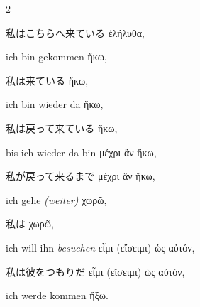 \begin{paracol}{2}
\begin{enumerate}[leftmargin=0pt,rightmargin=0pt,listparindent =1cm,labelindent=1cm,labelsep=1ex,labelwidth={*},itemindent={*},align=left]
\begin{continuousitemline}
\begin{japanese}
私はこちらへ来ている \textgreek[variant=ancient]{ἐλήλυθα,}
\end{japanese}
\switchcolumn*

\begin{german}
ich bin gekommen \textgreek[variant=ancient]{ἥκω,}
\end{german}
\switchcolumn

\begin{japanese}
私は来ている \textgreek[variant=ancient]{ἥκω,}
\end{japanese}
\switchcolumn*

\begin{german}
ich bin wieder da \textgreek[variant=ancient]{ἥκω,}
\end{german}
\switchcolumn

\begin{japanese}
私は戻って来ている \textgreek[variant=ancient]{ἥκω,}
\end{japanese}
\switchcolumn*

\begin{german}
bis ich wieder da bin \textgreek[variant=ancient]{μέχρι ἃν ἥκω,}
\end{german}
\switchcolumn

\begin{japanese}
私が戻って来るまで \textgreek[variant=ancient]{μέχρι ἃν ἥκω,}
\end{japanese}
\switchcolumn*

\begin{german}
ich gehe \emph{(weiter)} \textgreek[variant=ancient]{χωρῶ,}
\end{german}
\switchcolumn

\begin{japanese}
私は \textgreek[variant=ancient]{χωρῶ,}
\end{japanese}
\switchcolumn*

\begin{german}
ich will ihn \emph{besuchen} \textgreek[variant=ancient]{εἶμι (εἴσειμι)
ὡς αὐτόν,}
\end{german}
\switchcolumn

\begin{japanese}
私は彼をつもりだ \textgreek[variant=ancient]{εἶμι (εἴσειμι)
ὡς αὐτόν,}
\end{japanese}
\switchcolumn*

\begin{german}
ich werde kommen \textgreek[variant=ancient]{ἥξω.}
\end{german}
\switchcolumn


\end{continuousitemline}
\end{enumerate}
\end{paracol}
